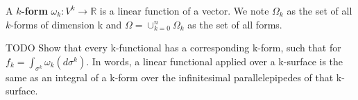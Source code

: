 \documentclass[11pt,letterpaper,fleqn]{memoir}
\begin{document}
\begin{defn}
	A \textbf{$k$-form} $\omega_k : V^k \to \mathbb{R}$ is a linear function of a vector. We note $\Omega_k$ as the set of all $k$-forms of dimension k and $\Omega = \cup_{k=0}^n\Omega_k$ as the set of all forms. 
\end{defn}

\begin{prop}
	TODO Show that every k-functional has a corresponding k-form, such that for $f_k = \int_{\sigma^k} \omega_k(d\sigma^k)$. In words, a linear functional applied over a k-surface is the same as an integral of a k-form over the infinitesimal parallelepipedes of that k-surface. 
\end{prop}

\fi
\end{document}
